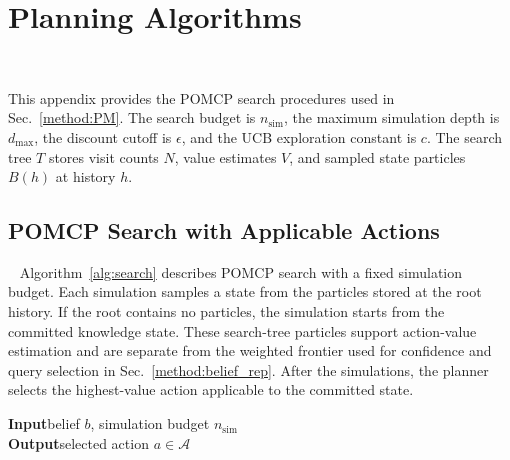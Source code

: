 
\section{Planning Algorithms}~\label{appx:algorithms}

This appendix provides the POMCP search procedures used in Sec.~\ref{method:PM}. The search budget is $n_{\mathrm{sim}}$, the maximum simulation depth is $d_{\max}$, the discount cutoff is $\epsilon$, and the UCB exploration constant is $c$. The search tree $T$ stores visit counts $N$, value estimates $V$, and sampled state particles $B(h)$ at history $h$.

\normalem
\subsection{POMCP Search with Applicable Actions}~\label{appx:alg_search}
Algorithm~\ref{alg:search} describes POMCP search with a fixed simulation budget. Each simulation samples a state from the particles stored at the root history. If the root contains no particles, the simulation starts from the committed knowledge state. These search-tree particles support action-value estimation and are separate from the weighted frontier used for confidence and query selection in Sec.~\ref{method:belief_rep}. After the simulations, the planner selects the highest-value action applicable to the committed state.

\begin{algorithm}[H]
\caption{POMCP Search with Applicable Actions}
\label{alg:search}
\textbf{Input}\quad belief $b$, simulation budget $n_{\mathrm{sim}}$ \\
\textbf{Output}\quad selected action $a \in \mathcal{A}$
\BlankLine

\end{algorithm}

